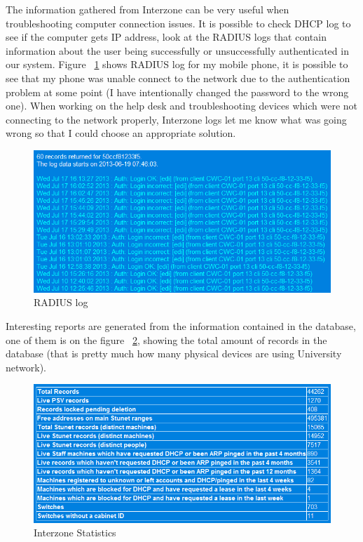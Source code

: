 \documentclass[10pt,a4paper,headinclude=true,twoside]{report}
\begin{document}
The information gathered from Interzone can be very useful when troubleshooting computer connection issues. It is possible to check DHCP log to see if the computer gets IP address, look at the RADIUS logs that contain information about the user being successfully or unsuccessfully authenticated in our system. Figure ~\ref{fig:interzone_radius} shows RADIUS log for my mobile phone, it is possible to see that my phone was unable connect to the network due to the authentication problem at some point (I have intentionally changed the password to the wrong one). When working on the help desk and troubleshooting devices which were not connecting to the network properly, Interzone logs let me know what was going wrong so that I could choose an appropriate solution. 

\begin{figure}[H]
\centering
\centerline{\includegraphics[scale=0.5]{./interzone_radius}}
\caption{RADIUS log}
\label{fig:interzone_radius}
\end{figure}

Interesting reports are generated from the information contained in the database, one of them is on the figure ~\ref{fig:interzone_statistics}, showing the total amount of records in the database (that is pretty much how many physical devices are using University network).

\begin{figure}[H]
\centering
\centerline{\includegraphics[scale=0.5]{./interzone_statistics}}
\caption{Interzone Statistics}
\label{fig:interzone_statistics}
\end{figure}
\end{document}
